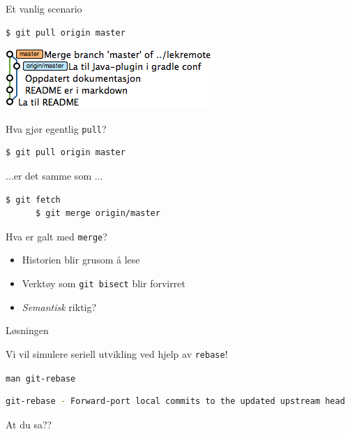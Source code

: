 \documentclass{beamer}
\begin{document}
\begin{frame}[fragile]{Et vanlig scenario}
    \begin{lstlisting}[language=bash]
      $ git pull origin master
    \end{lstlisting}
    \medskip
    \pause
    \includegraphics[scale=0.7]{2.png}
\end{frame}

\begin{frame}[fragile]{Hva gjør egentlig \texttt{pull}?}
    \begin{lstlisting}[language=bash]
      $ git pull origin master
    \end{lstlisting}
    \medskip
    ...er det samme som ...
    \medskip
    \begin{lstlisting}[language=bash]
      $ git fetch
      $ git merge origin/master
    \end{lstlisting}
\end{frame}


\begin{frame}{Hva er galt med \texttt{merge}?}
    \begin{itemize}
        \item<1-> Historien blir grusom å lese
        \item<2-> Verktøy som \texttt{git bisect} blir forvirret
        \item<3-> \emph{Semantisk} riktig?
    \end{itemize}
\end{frame}

\begin{frame}{Løsningen}
    \begin{center}
        Vi vil simulere seriell utvikling ved hjelp av \texttt{rebase}!
    \end{center}
\end{frame}

\begin{frame}[fragile]{\texttt{man git-rebase}}
    \begin{lstlisting}[language=bash]
git-rebase - Forward-port local commits to the updated upstream head
    \end{lstlisting}
    \medskip
    \pause
    At du sa??
\end{frame}
\end{document}
